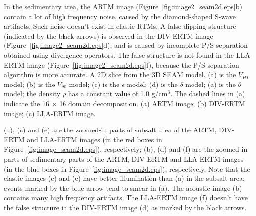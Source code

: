 \documentclass[manuscript,ulem,graphix,revised]{geophysics}
\begin{document}
In the sedimentary area, the ARTM image (Figure~\ref{fig:image2_seam2d.eps}b) contain a lot of high frequency noise, caused by the diamond-shaped S-wave artifacts. Such noise doesn't exist in elastic RTMs. 
A false dipping structure (indicated by the black arrows) is observed in the DIV-ERTM image (Figure~\ref{fig:image2_seam2d.eps}d), and is caused by incomplete P/S separation obtained using divergence operators. 
The false structure is not found in the LLA-ERTM image (Figure~\ref{fig:image2_seam2d.eps}f), because the P/S separation algorithm is more accurate.
{
A 2D slice from the 3D SEAM model. 
(a) is the $V_{P0}$ model; 
(b) is the $V_{S0}$ model; 
(c) is the $\epsilon$ model; 
(d) is the $\delta$ model; 
(a) is the $\theta$ model; the density $\rho$ has a constant value of 1.0 g/cm$^3$. The dashed lines in (a) indicate the 16 $\times$ 16 domain decomposition.
}
{
(a) ARTM image; (b) DIV-ERTM image; (c) LLA-ERTM image. 
}

{
\small{
(a), (c) and (e) are the zoomed-in parts of subsalt area of the ARTM, DIV-ERTM and LLA-ERTM images (in the red boxes in Figure~\ref{fig:image_seam2d.eps}), respectively; 
(b), (d) and (f) are the zoomed-in parts of sedimentary parts of the ARTM, DIV-ERTM and LLA-ERTM images (in the blue boxes in Figure~\ref{fig:image_seam2d.eps}), respectively.
Note that the elastic images (c) and (e) have better illumination than (a) in the subsalt area; events marked by the blue arrow tend to smear in (a).
The acoustic image (b) contains many high frequency artifacts. The LLA-ERTM image (f) doesn't have the false structure in the DIV-ERTM image (d) as marked by the black arrows.}
}

\end{document}
